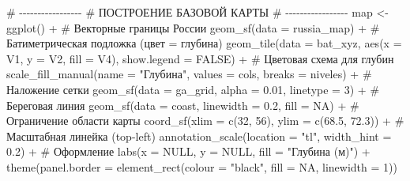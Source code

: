 \documentclass[
  letterpaper,
  DIV=11,
  numbers=noendperiod]{scrreprt}
\newenvironment{Shaded}{\begin{snugshade}}{\end{snugshade}}
\newcommand{\AttributeTok}[1]{\textcolor[rgb]{0.40,0.45,0.13}{#1}}
\newcommand{\CommentTok}[1]{\textcolor[rgb]{0.37,0.37,0.37}{#1}}
\newcommand{\ConstantTok}[1]{\textcolor[rgb]{0.56,0.35,0.01}{#1}}
\newcommand{\DecValTok}[1]{\textcolor[rgb]{0.68,0.00,0.00}{#1}}
\newcommand{\FloatTok}[1]{\textcolor[rgb]{0.68,0.00,0.00}{#1}}
\newcommand{\FunctionTok}[1]{\textcolor[rgb]{0.28,0.35,0.67}{#1}}
\newcommand{\NormalTok}[1]{\textcolor[rgb]{0.00,0.23,0.31}{#1}}
\newcommand{\OtherTok}[1]{\textcolor[rgb]{0.00,0.23,0.31}{#1}}
\newcommand{\SpecialCharTok}[1]{\textcolor[rgb]{0.37,0.37,0.37}{#1}}
\newcommand{\StringTok}[1]{\textcolor[rgb]{0.13,0.47,0.30}{#1}}
\begin{document}
\begin{Shaded}
\begin{Highlighting}[]
\CommentTok{\# {-}{-}{-}{-}{-}{-}{-}{-}{-}{-}{-}{-}{-}{-}{-}{-}{-}}
\CommentTok{\# ПОСТРОЕНИЕ БАЗОВОЙ КАРТЫ}
\CommentTok{\# {-}{-}{-}{-}{-}{-}{-}{-}{-}{-}{-}{-}{-}{-}{-}{-}{-}}
\NormalTok{map }\OtherTok{\textless{}{-}} \FunctionTok{ggplot}\NormalTok{() }\SpecialCharTok{+}
  \CommentTok{\# Векторные границы России}
  \FunctionTok{geom\_sf}\NormalTok{(}\AttributeTok{data =}\NormalTok{ russia\_map) }\SpecialCharTok{+}
  \CommentTok{\# Батиметрическая подложка (цвет = глубина)}
  \FunctionTok{geom\_tile}\NormalTok{(}\AttributeTok{data =}\NormalTok{ bat\_xyz, }\FunctionTok{aes}\NormalTok{(}\AttributeTok{x =}\NormalTok{ V1, }\AttributeTok{y =}\NormalTok{ V2, }\AttributeTok{fill =}\NormalTok{ V4), }\AttributeTok{show.legend =} \ConstantTok{FALSE}\NormalTok{) }\SpecialCharTok{+}
  \CommentTok{\# Цветовая схема для глубин}
  \FunctionTok{scale\_fill\_manual}\NormalTok{(}\AttributeTok{name =} \StringTok{"Глубина"}\NormalTok{, }\AttributeTok{values =}\NormalTok{ cols, }\AttributeTok{breaks =}\NormalTok{ niveles) }\SpecialCharTok{+}
  \CommentTok{\# Наложение сетки}
  \FunctionTok{geom\_sf}\NormalTok{(}\AttributeTok{data =}\NormalTok{ ga\_grid, }\AttributeTok{alpha =} \FloatTok{0.01}\NormalTok{, }\AttributeTok{linetype =} \DecValTok{3}\NormalTok{) }\SpecialCharTok{+}
  \CommentTok{\# Береговая линия}
  \FunctionTok{geom\_sf}\NormalTok{(}\AttributeTok{data =}\NormalTok{ coast, }\AttributeTok{linewidth =} \FloatTok{0.2}\NormalTok{, }\AttributeTok{fill =} \ConstantTok{NA}\NormalTok{) }\SpecialCharTok{+}
  \CommentTok{\# Ограничение области карты}
  \FunctionTok{coord\_sf}\NormalTok{(}\AttributeTok{xlim =} \FunctionTok{c}\NormalTok{(}\DecValTok{32}\NormalTok{, }\DecValTok{56}\NormalTok{), }\AttributeTok{ylim =} \FunctionTok{c}\NormalTok{(}\FloatTok{68.5}\NormalTok{, }\FloatTok{72.3}\NormalTok{)) }\SpecialCharTok{+}
  \CommentTok{\# Масштабная линейка (top{-}left)}
  \FunctionTok{annotation\_scale}\NormalTok{(}\AttributeTok{location =} \StringTok{"tl"}\NormalTok{, }\AttributeTok{width\_hint =} \FloatTok{0.2}\NormalTok{) }\SpecialCharTok{+}
  \CommentTok{\# Оформление}
  \FunctionTok{labs}\NormalTok{(}\AttributeTok{x =} \ConstantTok{NULL}\NormalTok{, }\AttributeTok{y =} \ConstantTok{NULL}\NormalTok{, }\AttributeTok{fill =} \StringTok{"Глубина (м)"}\NormalTok{) }\SpecialCharTok{+}
  \FunctionTok{theme}\NormalTok{(}\AttributeTok{panel.border =} \FunctionTok{element\_rect}\NormalTok{(}\AttributeTok{colour =} \StringTok{"black"}\NormalTok{, }\AttributeTok{fill =} \ConstantTok{NA}\NormalTok{, }\AttributeTok{linewidth =} \DecValTok{1}\NormalTok{))}


\end{Highlighting}
\end{Shaded}
\end{document}
